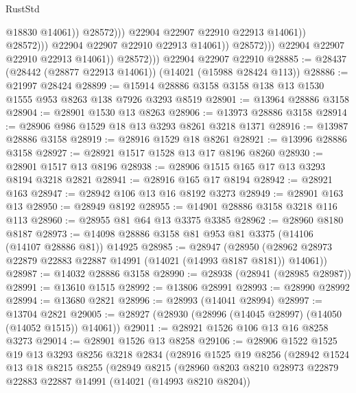\begin{lexlean}{RustStd}
\begin{coremodule}
                                            @18830
                                            @14061))
                                        @28572)))
                                  @22904
                                  @22907
                                  @22910
                                  @22913
                                  @14061))
                              @28572)))
                        @22904
                        @22907
                        @22910
                        @22913
                        @14061))
                    @28572)))
              @22904
              @22907
              @22910
              @22913
              @14061))
          @28572)))
    @22904
    @22907
    @22910
@28885 := @28437 (@28442 (@28877 @22913 @14061)) (@14021 (@15988 @28424 @113))
@28886 := @21997 @28424
@28899 := @15914 @28886 @3158 @3158 @138 @13 @1530 @1555 @953 @8263 @138 @7926 @3293 @8519
@28901 := @13964 @28886 @3158
@28904 := @28901 @1530 @13 @8263
@28906 := @13973 @28886 @3158
@28914 := @28906 @986 @1529 @18 @13 @3293 @8261 @3218 @1371
@28916 := @13987 @28886 @3158
@28919 := @28916 @1529 @18 @8261
@28921 := @13996 @28886 @3158
@28927 := @28921 @1517 @1528 @13 @17 @8196 @8260
@28930 := @28901 @1517 @13 @8196
@28938 := @28906 @1515 @165 @17 @13 @3293 @8194 @3218 @2821
@28941 := @28916 @165 @17 @8194
@28942 := @28921 @163
@28947 := @28942 @106 @13 @16 @8192 @3273
@28949 := @28901 @163 @13
@28950 := @28949 @8192
@28955 := @14901 @28886 @3158 @3218 @116 @113
@28960 := @28955 @81 @64 @13 @3375 @3385
@28962 := @28960 @8180 @8187
@28973 := @14098 @28886 @3158 @81 @953 @81 @3375 (@14106 (@14107 @28886 @81)) @14925
@28985 := @28947
    (@28950 (@28962 @28973 @22879 @22883 @22887 @14991 (@14021 (@14993 @8187 @8181)) @14061))
@28987 := @14032 @28886 @3158
@28990 := @28938 (@28941 (@28985 @28987))
@28991 := @13610 @1515
@28992 := @13806 @28991
@28993 := @28990 @28992
@28994 := @13680 @2821
@28996 := @28993 (@14041 @28994)
@28997 := @13704 @2821
@29005 := @28927 (@28930 (@28996 (@14045 @28997) (@14050 (@14052 @1515)) @14061))
@29011 := @28921 @1526 @106 @13 @16 @8258 @3273
@29014 := @28901 @1526 @13 @8258
@29106 := @28906
    @1522
    @1525
    @19
    @13
    @3293
    @8256
    @3218
    @2834
    (@28916
      @1525
      @19
      @8256
      (@28942
        @1524
        @13
        @18
        @8215
        @8255
        (@28949
          @8215
          (@28960
            @8203
            @8210
            @28973
            @22879
            @22883
            @22887
            @14991
            (@14021 (@14993 @8210 @8204))

\end{coremodule}
\end{lexlean}

